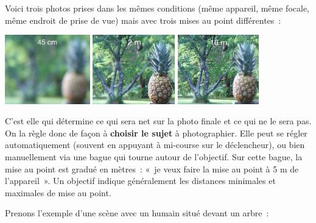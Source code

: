 \documentclass[../../main/main.tex]{subfiles}
\begin{document}
Voici trois photos prises dans les mêmes conditions (même appareil, même focale,
même endroit de prise de vue) mais avec trois mises au point différentes~:
\begin{center}
	\includegraphics[height=3cm]{miseaupt-45cm.png}
	\includegraphics[height=3cm]{miseaupt-2m.png}
	\includegraphics[height=3cm]{miseaupt-10m.png}
\end{center}

C'est elle qui détermine ce qui sera net sur la photo finale et ce qui ne le
sera pas. On la règle donc de façon à \textbf{choisir le sujet} à photographier.
Elle peut se régler automatiquement (souvent en appuyant à mi-course sur le
déclencheur), ou bien manuellement via une bague qui tourne autour de
l'objectif. Sur cette bague, la mise au point est gradué en mètres~: «~je veux
faire la mise au point à 5 m de l'appareil~». Un objectif indique généralement
les distances minimales et maximales de mise au point.

Prenons l'exemple d'une scène avec un humain situé devant un arbre~:
\end{document}
